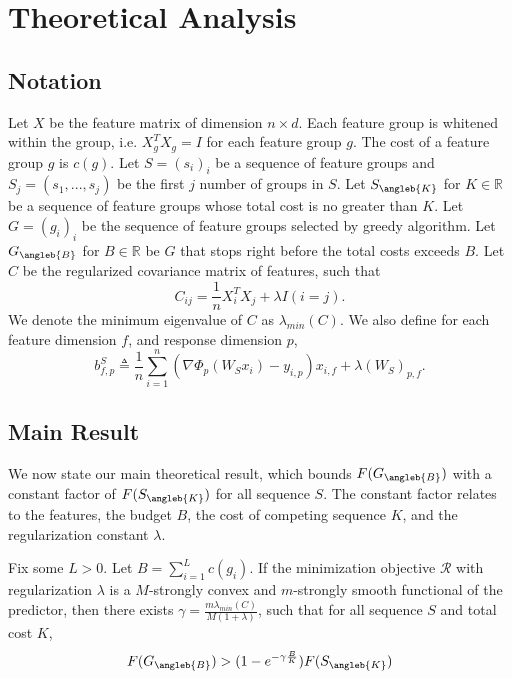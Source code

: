 \section{Theoretical Analysis}
\label{sec:proof}

\subsection{Notation}
Let $X$ be the feature matrix of dimension $n \times d$. 
Each feature group is whitened within the group, i.e. $X_g^TX_g = I$ for each feature group $g$. 
The cost of a feature group $g$ is $c(g)$. 
Let $S = (s_i)_i$ be a sequence of feature groups
and $S_j = (s_1, ..., s_j)$ be the first $j$ number of groups in $S$.  
Let $S_{\angleb{K}}$ for $K \in \mathbb{R}$ be a sequence of feature groups whose total cost is no greater than $K$. 
Let $G = (g_i)_i$ be the sequence of feature groups selected by greedy algorithm. 
Let $G_{\angleb{B}}$ for $B \in \mathbb{R}$ be $G$ that stops right before the total costs exceeds $B$. 
Let $C$ be the regularized covariance matrix of features, such that
  \begin{equation}
    C_{ij} = \frac{1}{n} X_i^TX_j + \lambda I(i=j).
  \end{equation}
We denote the minimum eigenvalue of $C$ as $\lambda_{min}(C)$. 
We also define for each feature dimension $f$, and response dimension $p$, 
\begin{equation}
 b_{f,p}^S \triangleq \frac{1}{n}\sum_{i=1}^n (\nabla\Phi_p(W_Sx_i) - y_{i,p})x_{i,f}
    + \lambda (W_S)_{p, f}. 
\end{equation}

\subsection{Main Result}
We now state our main theoretical result, which bounds $F(G_{\angleb{B}})$ with a constant factor of 
$F(S_{\angleb{K}})$ for all sequence $S$. The constant factor relates to the features, the budget $B$, 
the cost of competing sequence $K$, and the regularization constant $\lambda$. 
\begin{theorem}
Fix some $L > 0$. Let $B = \sum _{i=1}^L c(g_i)$. 
If the minimization objective $\mathcal{R}$ 
 with regularization $\lambda$
is a $M$-strongly convex and $m$-strongly smooth
 functional of the predictor, then there exists 
  $\gamma = \frac{m\lambda _{min}(C)}{M(1+\lambda)}$, such that
for all sequence $S$ and total cost $K$, 
\begin{align}
  F(G_{\angleb{B}}) > (1 - e^{-\gamma\frac{B}{K}})F(S_{\angleb{K}})
\end{align}
\label{thm:main}
\end{theorem}

